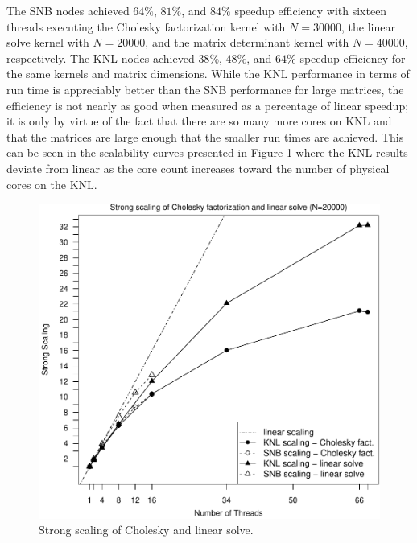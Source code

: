 The SNB nodes achieved $64\%$, $81\%$, and $84\%$ speedup efficiency with sixteen threads
executing the Cholesky factorization kernel with $N=30000$, the
linear solve kernel with $N=20000$, and the matrix determinant
kernel with $N=40000$, respectively.  The KNL nodes achieved $38\%$, $48\%$, and $64\%$ speedup efficiency
for the same kernels and matrix dimensions. While the KNL performance in terms of
run time is appreciably better than the SNB performance for large matrices, the efficiency
is not nearly as good when measured as a percentage of linear speedup; it is only by
virtue of the fact that there are so many more cores on KNL and that the matrices are large
enough that the smaller run times are achieved.  This can be seen in the scalability curves
presented in Figure \ref{fig:cholSolveScale} where the KNL results deviate from linear as
the core count increases toward the number of physical cores on the KNL.
\begin{figure}
\includegraphics[height=\columnwidth, width=\columnwidth]{chol_solve_20000_68-ss.pdf}
\caption{Strong scaling of Cholesky and linear solve.}
\label{fig:cholSolveScale}
\end{figure}

